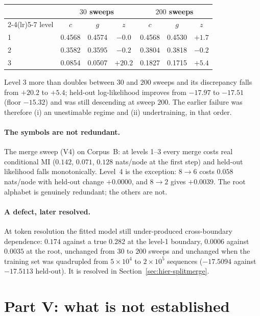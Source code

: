 \begin{center}
\begin{tabular}{lcccccc}
\toprule
 & \multicolumn{3}{c}{$30$ sweeps} & \multicolumn{3}{c}{$200$ sweeps} \\
\cmidrule(lr){2-4}\cmidrule(lr){5-7}
level & $c$ & $g$ & $z$ & $c$ & $g$ & $z$ \\
\midrule
1 & 0.4568 & 0.4574 & $-0.0$ & 0.4568 & 0.4530 & $+1.7$ \\
2 & 0.3582 & 0.3595 & $-0.2$ & 0.3804 & 0.3818 & $-0.2$ \\
3 & 0.0854 & 0.0507 & $+20.2$ & 0.1827 & 0.1715 & $+5.4$ \\
\bottomrule
\end{tabular}
\end{center}

\noindent
Level 3 more than doubles between $30$ and $200$ sweeps and its discrepancy
falls from $+20.2$ to $+5.4$; held-out log-likelihood improves from $-17.97$ to
$-17.51$ (floor $-15.32$) and was still descending at sweep $200$. The earlier
failure was therefore (i) an unestimable regime and (ii) undertraining, in that
order.

\paragraph{The symbols are not redundant.}
The merge sweep (V4) on Corpus~B: at levels 1--3 every merge costs real
conditional MI ($0.142$, $0.071$, $0.128$ nats/node at the first step) and
held-out likelihood falls monotonically. Level~4 is the exception: $8\to6$
costs $0.058$ nats/node with held-out change $+0.0000$, and $8\to2$ gives
$+0.0039$. The root alphabet is genuinely redundant; the others are not.

\paragraph{A defect, later resolved.}
At token resolution the fitted model still under-produced cross-boundary
dependence: $0.174$ against a true $0.282$ at the level-1 boundary, $0.0006$
against $0.0035$ at the root, unchanged from $30$ to $200$ sweeps and unchanged
when the training set was quadrupled from $5\times10^4$ to $2\times10^5$
sequences ($-17.5094$ against $-17.5113$ held-out). It is resolved in
Section~\ref{sec:hier-splitmerge}.

\section{Part V: what is not established}
\label{sec:hier-negative}

